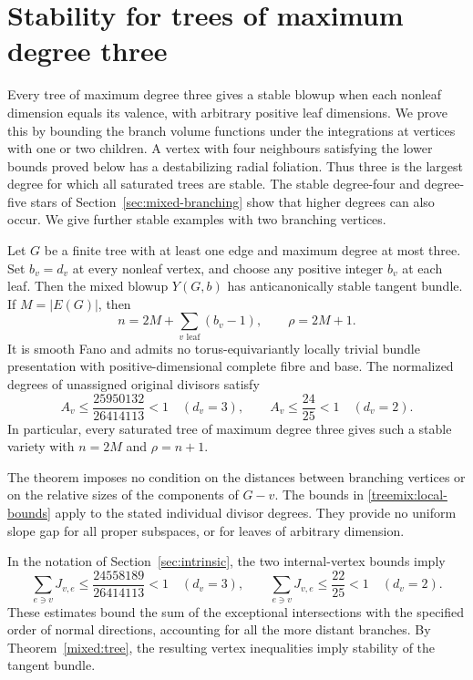 \section{Stability for trees of maximum degree three}
\label{sec:mixed-tree-threshold}

Every tree of maximum degree three gives a stable blowup when each
nonleaf dimension equals its valence, with arbitrary positive leaf
dimensions. We prove this by bounding the branch volume functions under
the integrations at vertices with one or two children. A vertex with
four neighbours satisfying the lower bounds proved below has a
destabilizing radial foliation. Thus three is the largest degree for
which all saturated trees are stable. The stable degree-four and
degree-five stars of Section~\ref{sec:mixed-branching} show that
higher degrees can also occur. We give further stable examples with
two branching vertices.

\begin{theorem}\label{treemix:subcubic}
Let $G$ be a finite tree with at least one edge and maximum degree at
most three. Set $b_v=d_v$ at every nonleaf vertex, and choose any positive
integer $b_v$ at each leaf. Then the mixed blowup $Y(G,b)$ has
anticanonically stable tangent bundle. If $M=|E(G)|$, then
\[
 n=2M+\sum_{v\text{ leaf}}(b_v-1),\qquad \rho=2M+1.
\]
It is smooth Fano and admits no torus-equivariantly locally trivial
bundle presentation with positive-dimensional complete fibre and base.
The normalized degrees of unassigned original divisors satisfy
\begin{equation}\label{treemix:local-bounds}
 A_v\le\frac{25950132}{26414113}<1\quad(d_v=3),\qquad
 A_v\le\frac{24}{25}<1\quad(d_v=2).
\end{equation}
In particular, every saturated tree of maximum degree three gives such
a stable variety with $n=2M$ and $\rho=n+1$.
\end{theorem}

The theorem imposes no condition on the distances between branching
vertices or on the relative sizes of the components of $G-v$.
The bounds in \eqref{treemix:local-bounds} apply to the stated individual
divisor degrees. They provide no uniform slope gap for all proper
subspaces, or for leaves of arbitrary dimension.

In the notation of Section~\ref{sec:intrinsic}, the two internal-vertex
bounds imply
\[
 \sum_{e\ni v}J_{v,e}\le\frac{24558189}{26414113}<1
 \quad(d_v=3),\qquad
 \sum_{e\ni v}J_{v,e}\le\frac{22}{25}<1
 \quad(d_v=2).
\]
These estimates bound the sum of the exceptional intersections with
the specified order of normal directions, accounting for all the
more distant branches. By Theorem~\ref{mixed:tree}, the resulting
vertex inequalities imply stability of the tangent bundle.

